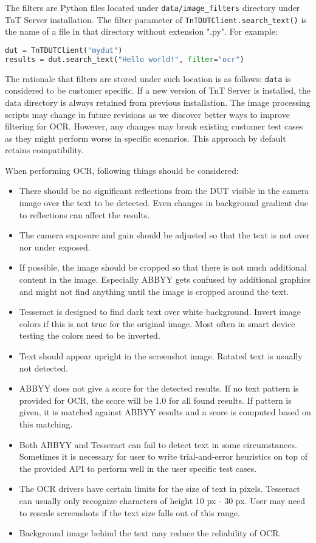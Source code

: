 The filters are Python files located under \texttt{data/image{\_}filters} directory under TnT Server installation. The filter parameter
of \texttt{TnTDUTClient.search{\_}text()} is the name of a file in that directory without extension ".py". For example:

\begin{lstlisting}[language=Python]
dut = TnTDUTClient("mydut")
results = dut.search_text("Hello world!", filter="ocr")
\end{lstlisting}

The rationale that filters are stored under such location is as follows: \texttt{data} is considered to be customer specific. If
a new version of TnT Server is installed, the data directory is always retained from previous installation. The image processing
scripts may change in future revisions as we discover better ways to improve filtering for OCR. However, any changes may
break existing customer test cases as they might perform worse in specific scenarios. This approach by default retains compatibility.

When performing OCR, following things should be considered:

\begin{itemize}
\item There should be no significant reflections from the DUT visible in the camera image over the text to be detected. Even changes in background gradient due to reflections can affect the results.
\item The camera exposure and gain should be adjusted so that the text is not over nor under exposed.
\item If possible, the image should be cropped so that there is not much additional content in the image. Especially ABBYY gets confused by additional graphics and might not find anything until the image is cropped around the text.
\item Tesseract is designed to find dark text over white background. Invert image colors if this is not true for the original image. Most often in smart device testing the colors need to be inverted.
\item Text should appear upright in the screenshot image. Rotated text is usually not detected.
\item ABBYY does not give a score for the detected results. If no text pattern is provided for OCR, the score will be 1.0 for all found results. If pattern is given, it is matched against ABBYY results and a score is computed based on this matching.
\item Both ABBYY and Tesseract can fail to detect text in some circumstances. Sometimes it is necessary for user to write trial-and-error heuristics on top of the provided API to perform well in the user specific test cases.
\item The OCR drivers have certain limits for the size of text in pixels. Tesseract can usually only recognize characters of height 10 px - 30 px. User may need to rescale screenshots if the text size falls out of this range.
\item Background image behind the text may reduce the reliability of OCR.
\end{itemize}

